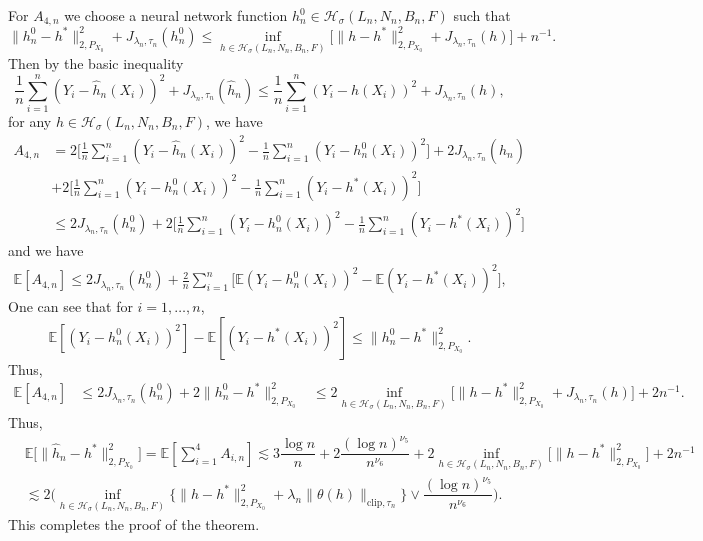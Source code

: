 \documentclass[10pt,twoside]{article}
\numberwithin{equation}{section}
\newcommand{\E}{\ensuremath{\mathbb{E}}}
\begin{document}
For $A_ {4, n} $ we choose a neural network function $h_ {n} ^0 \in \mathcal{H}_{\sigma}(L_n, N_n, B_n, F) $ such that 
%
\[ \| h_ {n}^ {0} - h^ {*} \|_{2, P_ {X_0}}^ {2} + J_{\lambda_n, \tau_n}(h_ n ^0) \leq \underset{h \in \mathcal{H}_{\sigma}(L_n, N_n, B_n, F)}{\inf}\Big[\|h- h^ {*} \|_{2, P_ {X_0}} ^2 +  J_{\lambda_n, \tau_n} (h) \Big] + n^ {-1}.  \] 
%
%
Then by the basic inequality 
%
\[ \frac{1}{n} \sum_{i=1}^n \left(Y_{i} - \widehat{h}_n (X_i) \right) ^2  + J_{\lambda_n, \tau_n} (\widehat{h}_n) \leq  \frac{1}{n} \sum_{i=1}^n \left(Y_{i} - h (X_{i}) \right)^2  + J_{\lambda_n, \tau_n} (h),  \]
%
 for any  $ h \in \mathcal{H}_ {\sigma}(L_n, N_n, B_n, F) $, we have  
%
\begin{align}
 A_ {4, n} \nonumber & = 2 \Big[ \frac{1}{n} \sum_{i=1}^n (Y_i - \widehat{h}_n (X_i) )^2 - \frac{1}{n} \sum_{i=1}^n (Y_{i} - h_n^0 (X_i) )^2 \Big] +  2 J_{\lambda_n, \tau_n} (\widehat{h}_n)  
 \\
 &  +  2 \Big[ \frac{1}{n} \sum_{i=1}^n (Y_i - h_n^0 (X_i) )^2 - \frac{1}{n} \sum_{i=1}^n (Y_i - h^ {*} (X_i) )^2  \Big]
\\
 \nonumber &   \leq  2J_{\lambda_n, \tau_n} (h_n^0 ) + 2 \Big[ \frac{1}{n} \sum_{i=1}^n (Y_i - h_n^0 (X_i))^2 - \frac{1}{n} \sum_{i=1}^n (Y_i - h^ {*}(X_i) )^2  \Big]
\end{align}
%
and we have
%
\begin{align}
\E[ A_ {4, n}] \nonumber \leq  2J_{\lambda_n, \tau_n} (h_n^0 ) + \frac{2}{n} \sum_{i=1}^n \Big[ \E (Y_i - h_n^0 (X_i)) ^2 - \E (Y_i - h^ {*} (X_i)) ^2  \Big],
\end{align}
%
One can see that for $i=1, \dots, n$,
%
\[  \E[(Y_i - h_n^0 (X_i)) ^2] - \E[(Y_i - h^ {*}(X_i)) ^2] \leq \| {h}_n^0 - h^ {*} \|_{2, P_{X_0}} ^2.  \]
%
Thus,
%
\begin{align*}
\E[ A_ {4, n}] \nonumber  & \leq  2 J_{\lambda_n, \tau_n} (h_n^0) + 2 \| {h}_n^0 -h^{*} \|_{2, P_{X_0}} ^2 &  \leq  2 \underset{h \in \mathcal{H}_{\sigma} (L_n, N_n, B_n, F)}{\inf} \Big[ \|h- h^ {*} \|_{2, P_{X_0}} ^2 + J_{\lambda_n, \tau_n} (h) \Big] + 2 n^ {-1}.
\end{align*}
%
Thus, 
%
\begin{align}
\nonumber & \E \Big[ \| \widehat{h}_n - h^ {*}\|_ {2, P_ {X_0}}^ {2} \Big]   = \E \left[ \sum_{i=1} ^4 A_ {i, n} \right] 
 \lesssim 3 \dfrac{\log n}{n} + 2\dfrac{(\log n)^ {\nu_5}}{n^ {\nu_6}} +  2 \underset{h \in \mathcal{H}_ {\sigma} (L_n, N_n, B_n, F)}{\inf} \Big[ \| h- h^ {*} \|_ {2, P_ {X_0}} ^2  \Big] + 2 n^ {-1} 
\\
& \lesssim  2 \Bigg( \underset{h \in \mathcal{H}_ {\sigma}(L_n, N_n, B_n,  F)}{\inf} \{ \| h - h^ {*}\|_ {2, P_ {X_0}} ^2 + \lambda_n \| \theta (h) \|_ { \text{clip}, \tau_n} \} \lor  \dfrac{(\log n)^ {\nu_5}}{n^ {\nu_6}} \Bigg). 
\end{align}
% 
%
This completes the proof of the theorem.                             
\end{document}
